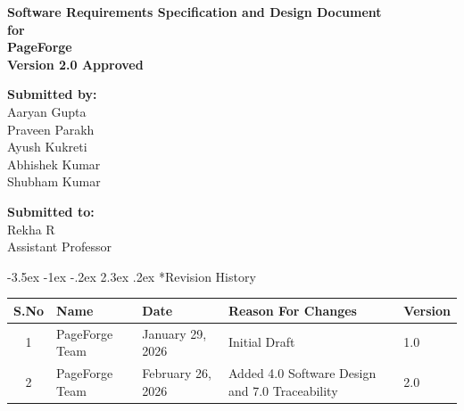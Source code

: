 \documentclass[12pt,a4paper]{article}
\makeatletter
\renewcommand\section{\@startsection{section}{1}{\z@}%
  {-3.5ex \@plus -1ex \@minus -.2ex}%
  {2.3ex \@plus .2ex}%
  {\needspace{3\baselineskip}\normalfont\Large\bfseries}}
\makeatother
\begin{document}
\begin{titlepage}
    \centering
    \vspace*{1cm}
    
    {\Huge \textbf{Software Requirements Specification and Design Document}}\\
    \vspace{0.5cm}
    {\Huge \textbf{for}}\\
    \vspace{0.5cm}
    {\Huge \textbf{PageForge}}\\
    
    \vspace{1.5cm}
    {\Large \textbf{Version 2.0 Approved}}\\
    \vspace{2cm}
    
    {\Large \textbf{Submitted by:}}\\
    \vspace{0.5cm}
    {\large Aaryan Gupta}\\
    {\large Praveen Parakh}\\
    {\large Ayush Kukreti}\\
    {\large Abhishek Kumar}\\
    {\large Shubham Kumar}\\
    
    \vspace{1.5cm}
    
    {\Large \textbf{Submitted to:}}\\
    \vspace{0.5cm}
    {\large Rekha R}\\
    {\large Assistant Professor}\\
    
    \vspace{2cm}
    
    \vspace{1.5cm}
\end{titlepage}

\newpage

\section*{Revision History}
\begin{tabularx}{\textwidth}{|c|l|l|X|l|}
\hline
\textbf{S.No} & \textbf{Name} & \textbf{Date} & \textbf{Reason For Changes} & \textbf{Version} \\
\hline
1 & PageForge Team & January 29, 2026 & Initial Draft & 1.0 \\
\hline
2 & PageForge Team & February 26, 2026 & Added 4.0 Software Design and 7.0 Traceability & 2.0 \\
\hline
\end{tabularx}
\newpage
\end{document}
